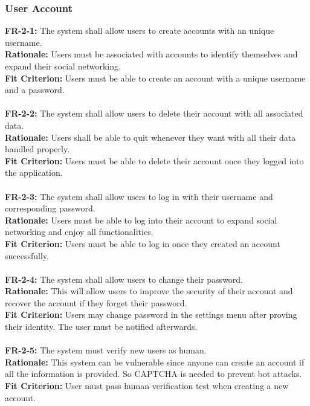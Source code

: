 \documentclass[12pt]{article}
\begin{document}
\subsubsection{User Account}
    \textbf{FR-2-1:} The system shall allow users to create accounts with an unique username.\\
    \textbf{Rationale:} Users must be associated with accounts to identify themselves and expand their social networking.\\
    \textbf{Fit Criterion:} Users must be able to create an account with a unique username and a password.\\\\
    \textbf{FR-2-2:} The system shall allow users to delete their account with all associated data.\\
    \textbf{Rationale:} Users shall be able to quit whenever they want with all their data handled properly.\\
    \textbf{Fit Criterion:} Users must be able to delete their account once they logged into the application.\\\\
    \textbf{FR-2-3:} The system shall allow users to log in with their username and corresponding password.\\
    \textbf{Rationale:} Users must be able to log into their account to expand social networking and enjoy all functionalities.\\
    \textbf{Fit Criterion:} Users must be able to log in once they created an account successfully.\\\\
    \textbf{FR-2-4:} The system shall allow users to change their password.\\
    \textbf{Rationale:} This will allow users to improve the security of their account and recover the account if they forget their password.\\
    \textbf{Fit Criterion:} Users may change password in the settings menu after proving their identity. The user must be notified afterwards.\\\\
    \textbf{FR-2-5:} The system must verify new users as human.\\
    \textbf{Rationale:} This system can be vulnerable since anyone can create an account if all the information is provided. So CAPTCHA is needed to prevent bot attacks.\\
    \textbf{Fit Criterion:} User must pass human verification test when creating a new account.\\\\
\end{document}
